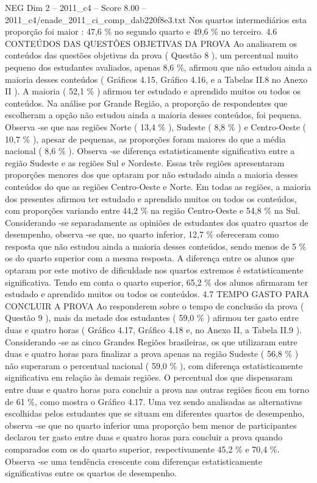 \begin{textsample}{NEG Dim 2 – 2011\_c4 – Score 8.00 – 2011\_c4/enade\_2011\_ci\_comp\_dab220f8e3.txt}
Nos quartos intermediários esta proporção foi maior : 47,6 \% no segundo quarto e 49,6 \% no terceiro. 4.6 CONTEÚDOS DAS QUESTÕES OBJETIVAS DA PROVA Ao analisarem os conteúdos das questões objetivas da prova ( Questão 8 ), um percentual muito pequeno dos estudantes avaliados, apenas 8,6 \%, afirmou que não estudou ainda a maioria desses conteúdos ( Gráficos 4.15, Gráfico 4.16, e a Tabelas II.8 no Anexo II ).
A maioria ( 52,1 \% ) afirmou ter estudado e aprendido muitos ou todos os conteúdos.
Na análise por Grande Região, a proporção de respondentes que escolheram a opção não estudou ainda a maioria desses conteúdos, foi pequena.
Observa -se que nas regiões Norte ( 13,4 \% ), Sudeste ( 8,8 \% ) e Centro-Oeste ( 10,7 \% ), apesar de pequenas, as proporções foram maiores do que a média nacional ( 8,6 \% ).
Observa -se diferença estatisticamente significativa entre a região Sudeste e as regiões Sul e Nordeste.
Essas três regiões apresentaram proporções menores dos que optaram por não estudado ainda a maioria desses conteúdos do que as regiões Centro-Oeste e Norte.
Em todas as regiões, a maioria dos presentes afirmou ter estudado e aprendido muitos ou todos os conteúdos, com proporções variando entre 44,2 \% na região Centro-Oeste e 54,8 \% na Sul.
Considerando -se separadamente as opiniões de estudantes dos quatro quartos de desempenho, observa -se que, no quarto inferior, 12,7 \% ofereceram como resposta que não estudou ainda a maioria desses conteúdos, sendo menos de 5 \% os do quarto superior com a mesma resposta.
A diferença entre os alunos que optaram por este motivo de dificuldade nos quartos extremos é estatisticamente significativa.
Tendo em conta o quarto superior, 65,2 \% dos alunos afirmaram ter estudado e aprendido muitos ou todos os conteúdos. 4.7 TEMPO GASTO PARA CONCLUIR A PROVA Ao responderem sobre o tempo de conclusão da prova ( Questão 9 ), mais da metade dos estudantes ( 59,0 \% ) afirmou ter gasto entre duas e quatro horas ( Gráfico 4.17, Gráfico 4.18 e, no Anexo II, a Tabela II.9 ).
Considerando -se as cinco Grandes Regiões brasileiras, os que utilizaram entre duas e quatro horas para finalizar a prova apenas na região Sudeste ( 56,8 \% ) não superaram o percentual nacional ( 59,0 \% ), com diferença estatisticamente significativa em relação às demais regiões.
O percentual dos que dispensaram entre duas e quatro horas para concluir a prova nas outras regiões ficou em torno de 61 \%, como mostra o Gráfico 4.17.
Uma vez sendo analisadas as alternativas escolhidas pelos estudantes que se situam em diferentes quartos de desempenho, observa -se que no quarto inferior uma proporção bem menor de participantes declarou ter gasto entre duas e quatro horas para concluir a prova quando comparados com os do quarto superior, respectivamente 45,2 \% e 70,4 \%.
Observa -se uma tendência crescente com diferenças estatisticamente significativas entre os quartos de desempenho.

\end{textsample}

